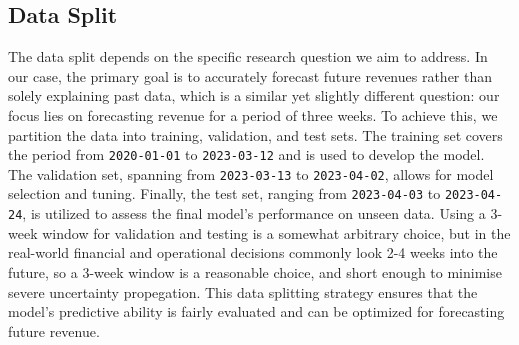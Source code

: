 \subsection{Data Split}
The data split depends on the specific research question we aim to address. In
our case, the primary goal is to accurately forecast future revenues rather
than solely explaining past data, which is a similar yet slightly different
question: our focus lies on forecasting revenue for a period of three weeks.
To achieve this, we partition the data into training, validation, and test
sets. The training set covers the period from \texttt{2020-01-01} to \texttt{2023-03-12} and is
used to develop the model. The validation set, spanning from \texttt{2023-03-13} to
\texttt{2023-04-02}, allows for model selection and tuning. Finally, the test set,
ranging from \texttt{2023-04-03} to \texttt{2023-04-24}, is utilized to assess
the final model's performance on unseen data. Using a 3-week window for
validation and testing is a somewhat arbitrary choice, but in the real-world
financial and operational decisions commonly look 2-4 weeks into the future, so
a 3-week window is a reasonable choice, and short enough to minimise severe
uncertainty propegation. This data splitting strategy ensures that the model's
predictive ability is fairly evaluated and can be optimized for forecasting future
revenue.

